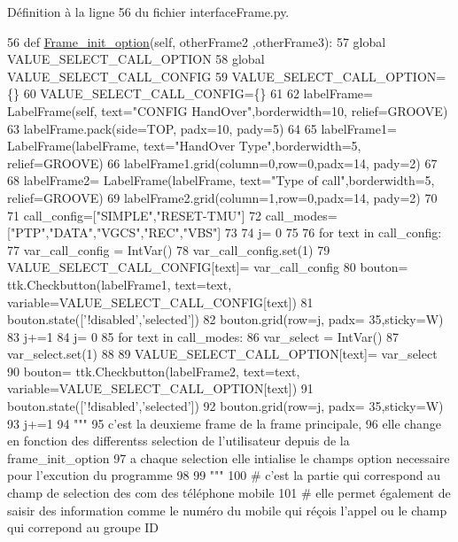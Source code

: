 Définition à la ligne 56 du fichier interface\+Frame.\+py.


\begin{DoxyCode}
56 \textcolor{keyword}{def }\hyperlink{namespaceScript_1_1interfaceFrame_aa7f559f2c9e8af048daa456cb3686155}{Frame\_init\_option}(self, otherFrame2 ,otherFrame3):
57     \textcolor{keyword}{global} VALUE\_SELECT\_CALL\_OPTION
58     \textcolor{keyword}{global} VALUE\_SELECT\_CALL\_CONFIG
59     VALUE\_SELECT\_CALL\_OPTION=\{\}
60     VALUE\_SELECT\_CALL\_CONFIG=\{\}
61 
62     labelFrame= LabelFrame(self, text=\textcolor{stringliteral}{"CONFIG HandOver"},borderwidth=10, relief=GROOVE)
63     labelFrame.pack(side=TOP, padx=10, pady=5)
64 
65     labelFrame1= LabelFrame(labelFrame, text=\textcolor{stringliteral}{"HandOver Type"},borderwidth=5, relief=GROOVE)
66     labelFrame1.grid(column=0,row=0,padx=14, pady=2)
67 
68     labelFrame2= LabelFrame(labelFrame, text=\textcolor{stringliteral}{"Type of call"},borderwidth=5, relief=GROOVE)
69     labelFrame2.grid(column=1,row=0,padx=14, pady=2)
70 
71     call\_config=[\textcolor{stringliteral}{"SIMPLE"},\textcolor{stringliteral}{"RESET-TMU"}]
72     call\_modes=[\textcolor{stringliteral}{"PTP"},\textcolor{stringliteral}{"DATA"},\textcolor{stringliteral}{"VGCS"},\textcolor{stringliteral}{"REC"},\textcolor{stringliteral}{"VBS"}]
73 
74     j= 0
75 
76     \textcolor{keywordflow}{for} text \textcolor{keywordflow}{in} call\_config:
77         var\_call\_config = IntVar()
78         var\_call\_config.set(1)
79         VALUE\_SELECT\_CALL\_CONFIG[text]= var\_call\_config
80         bouton= ttk.Checkbutton(labelFrame1, text=text, variable=VALUE\_SELECT\_CALL\_CONFIG[text])
81         bouton.state([\textcolor{stringliteral}{'!disabled'},\textcolor{stringliteral}{'selected'}])
82         bouton.grid(row=j, padx= 35,sticky=W)
83         j+=1
84     j= 0
85     \textcolor{keywordflow}{for} text \textcolor{keywordflow}{in} call\_modes:
86         var\_select = IntVar()
87         var\_select.set(1)
88 
89         VALUE\_SELECT\_CALL\_OPTION[text]= var\_select
90         bouton= ttk.Checkbutton(labelFrame2, text=text, variable=VALUE\_SELECT\_CALL\_OPTION[text])
91         bouton.state([\textcolor{stringliteral}{'!disabled'},\textcolor{stringliteral}{'selected'}])
92         bouton.grid(row=j, padx= 35,sticky=W)
93         j+=1
94 \textcolor{stringliteral}{"""
}
95 \textcolor{stringliteral}{c'est la deuxieme frame de la frame principale,
}
96 \textcolor{stringliteral}{elle change en fonction des differentss selection de l'utilisateur depuis de la frame\_init\_option
}
97 \textcolor{stringliteral}{a chaque selection elle intialise le champs option necessaire pour l'excution du programme 
}
98 \textcolor{stringliteral}{
}
99 \textcolor{stringliteral}{"""}
100 \textcolor{comment}{# c'est la partie qui correspond au champ de selection des com des téléphone mobile
}
101 \textcolor{comment}{# elle permet également de saisir des information comme le numéro du mobile qui réçois l'appel ou le champ
       qui correpond au groupe ID
}
\end{DoxyCode}
